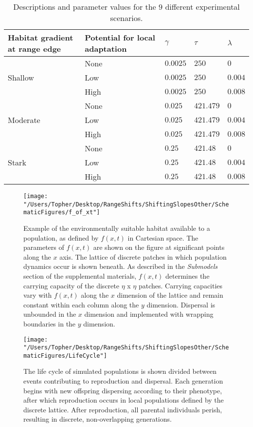 \documentclass[12pt, oneside]{article}
\begin{document}
\begin{table}
\renewcommand{\arraystretch}{1.5}
  \begin{tabular}{ p{4cm} | p{4cm} | p{1.5cm} | p{1.5cm} | p{1.5cm} }
    \hline
    Habitat gradient at range edge & Potential for local adaptation & $\gamma$ & $\tau$ & $\lambda$  \\ \hline \hline
     & None & $0.0025$ & $250$ & $0$ \\
    Shallow & Low & $0.0025$ & $250$ & $0.004$ \\
     & High & $0.0025$ & $250$ & $0.008$ \\ \hline
     & None & $0.025$ & $421.479$ & $0$ \\
    Moderate & Low & $0.025$ & $421.479$ & $0.004$ \\
     & High & $0.025$ & $421.479$ & $0.008$ \\ \hline
     & None & $0.25$ & $421.48$ & $0$ \\
    Stark & Low & $0.25$ & $421.48$ & $0.004$ \\
     & High & $0.25$ & $421.48$ & $0.008$ \\ 
    \hline
  \end{tabular}
\caption[LoF entry]{Descriptions and parameter values for the $9$ different experimental scenarios.}
\label{table:Scenarios}
\end{table}

\clearpage

\begin{figure}
\centering
\texttt{[image: "/Users/Topher/Desktop/RangeShifts/ShiftingSlopesOther/SchematicFigures/f\_of\_xt"]}
\vspace{-5mm}
\caption[LoF entry]{Example of the environmentally suitable habitat available to a population, as defined by $f(x,t)$ in Cartesian space. The parameters of $f(x,t)$ are shown on the figure at significant points along the $x$ axis. The lattice of discrete patches in which population dynamics occur is shown beneath. As described in the \textit{Submodels} section of the supplemental materials, $f(x,t)$ determines the carrying capacity of the discrete $\eta$ x $\eta$ patches. Carrying capacities vary with $f(x,t)$ along the $x$ dimension of the lattice and remain constant within each column along the $y$ dimension. Dispersal is unbounded in the $x$ dimension and implemented with wrapping boundaries in the $y$ dimension.}
\label{fig:EnvFunction}
\end{figure}

\begin{figure}
\centering
\texttt{[image: "/Users/Topher/Desktop/RangeShifts/ShiftingSlopesOther/SchematicFigures/LifeCycle"]}
\vspace{-5mm}
\caption[LoF entry]{The life cycle of simulated populations is shown divided between events contributing to reproduction and dispersal. Each generation begins with new offspring dispersing according to their phenotype, after which reproduction occurs in local populations defined by the discrete lattice. After reproduction, all parental individuals perish, resulting in discrete, non-overlapping generations.}
\label{fig:LifeCycle}
\end{figure}
\end{document}
